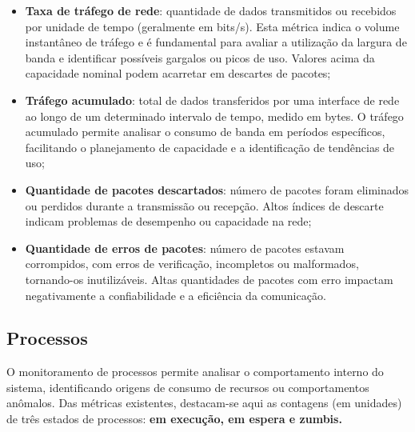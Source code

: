 \begin{itemize}
    \item \textbf{Taxa de tráfego de rede}: quantidade de dados transmitidos ou recebidos por unidade de tempo (geralmente em bits/s). Esta métrica indica o volume instantâneo de tráfego e é fundamental para avaliar a utilização da largura de banda e identificar possíveis gargalos ou picos de uso. Valores acima da capacidade nominal podem acarretar em descartes de pacotes;
    \item \textbf{Tráfego acumulado}: total de dados transferidos por uma interface de rede ao longo de um determinado intervalo de tempo, medido em bytes. O tráfego acumulado permite analisar o consumo de banda em períodos específicos, facilitando o planejamento de capacidade e a identificação de tendências de uso;
    \item \textbf{Quantidade de pacotes descartados}: número de pacotes foram eliminados ou perdidos durante a transmissão ou recepção. Altos índices de descarte indicam problemas de desempenho ou capacidade na rede;
    \item \textbf{Quantidade de erros de pacotes}: número de pacotes estavam corrompidos, com erros de verificação, incompletos ou malformados, tornando-os inutilizáveis. Altas quantidades de pacotes com erro impactam negativamente a confiabilidade e a eficiência da comunicação.
\end{itemize}

\subsection{Processos}
\label{subsection:Processos}

O monitoramento de processos \citep{processmetrics2025} permite analisar o comportamento interno do sistema, identificando origens de consumo de recursos ou comportamentos anômalos. Das métricas existentes, destacam-se aqui as contagens (em unidades) de três estados de processos: \textbf{em execução, em espera e zumbis.}

